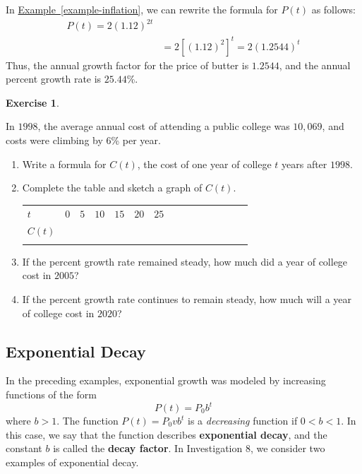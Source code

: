 \documentclass[10pt,]{book}
\newcommand{\terminology}[1]{\textbf{#1}}
\theoremstyle{plain}
\theoremstyle{definition}
\theoremstyle{definition}
\theoremstyle{definition}
\theoremstyle{definition}
\theoremstyle{definition}
\newtheorem{exercise}[theorem]{Exercise}
\numberwithin{equation}{section}
\newcommand{\hrulethin}  {\noalign{\hrule height 0.04em}}
\newcommand{\hrulethick} {\noalign{\hrule height 0.11em}}
\newcommand{\lt}{ < }
\newcommand{\gt}{ > }
\newcommand{\amp}{ & }
\begin{document}
    In \hyperref[example-inflation]{Example~\ref{example-inflation}}, we can rewrite the formula for \(P(t)\) as follows:
    \begin{align*}
    P(t) = 2(1.12)^{2t} \\
    \amp = 2\left[(1.12)^2\right]^t = 2(1.2544)^t
    \end{align*}
    Thus, the annual growth factor for the price of butter is \(1.2544\), and the annual percent growth rate is \(25.44\)\%.
%
\begin{exercise}\label{exercise-inflation}

    In \(1998\), the average annual cost of attending a public college was \textdollar{}\(10,069\), and costs were climbing by \(6\)\% per year.
    \leavevmode%
\begin{enumerate}[label=*\alph**]
\item\hypertarget{li-623}{}Write a formula for \(C(t)\), the cost of one year of college \(t\) years after \(1998\).\item\hypertarget{li-624}{}Complete the table and sketch a graph of \(C(t)\).
        \leavevmode%
\begin{table}
\centering
\begin{tabular}{AcAcAcAcAcAcAcA}\hrulethick
\(t\)&\(0\)&\(5\)&\(10\)&\(15\)&\(20\)&\(25\)\tabularnewline\hrulethin
\(C(t)\)&\(\)&\(\)&\(\)&\(\)&\(\)&\(\)\tabularnewline\hrulethin
\end{tabular}
\end{table}
\item\hypertarget{li-625}{}If the percent growth rate remained steady, how much did a year of college cost in \(2005\)?\item\hypertarget{li-626}{}If the percent growth rate continues to remain steady, how much will a year of college cost in \(2020\)?
        \end{enumerate}
\end{exercise}
\typeout{************************************************}
\typeout{************************************************}
\subsection[Exponential Decay]{Exponential Decay}\label{subsection-88}

    In the preceding examples, exponential growth was modeled by increasing functions of the form
    \begin{equation*}P(t) = P_0 b^t\end{equation*}
    where \(b \gt 1\). The function \(P(t) = P_0vb^t\) is a \emph{decreasing} function if \(0 \lt b \lt 1\). In this case, we say that the function describes \terminology{exponential decay}, and the constant \(b\) is called the \terminology{decay factor}. In Investigation 8, we consider two examples of exponential decay.
%
\typeout{************************************************}
\typeout{************************************************}
\end{document}
